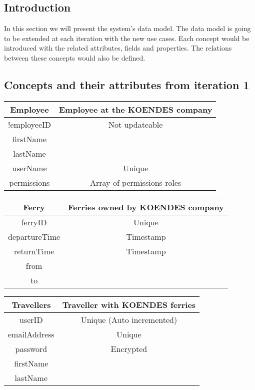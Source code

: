 
\subsection{Introduction}
In this section we will present the system's data model. The data model is going to be extended at each iteration with the new use cases. Each concept would be introduced with the related attributes, fields and properties. The relations between these concepts would also be defined.
\subsection{Concepts and their attributes from iteration 1}
\begin{table}[H]
\begin{tabular}{|c|c}
\cline{1-1}
Employee & Employee at the KOENDES company \\ \hline
!employeeID & Not updateable \\ firstName \\ lastName \\ userName & Unique \\ permissions & Array of permissions roles\\\hline
\end{tabular}
\end{table}

\begin{table}[H]
\begin{tabular}{|c|c}
\cline{1-1}
Ferry & Ferries owned by KOENDES company \\ \hline
ferryID & Unique \\ departureTime & Timestamp \\ returnTime & Timestamp \\ from \\ to \\\hline
\end{tabular}
\end{table}

\begin{table}[H]
\begin{tabular}{|c|c}
\cline{1-1}
Travellers & Traveller with KOENDES ferries \\ \hline
userID & Unique (Auto incremented) \\ emailAddress & Unique \\ password & Encrypted \\ firstName \\ lastName \\ \hline
\end{tabular}
\end{table}

